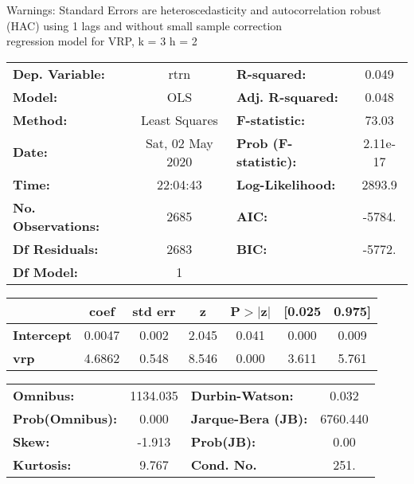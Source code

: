Warnings: \newline
 [1] Standard Errors are heteroscedasticity and autocorrelation robust (HAC) using 1 lags and without small sample correction\\ 

regression model for VRP, k = 3 h = 2\begin{center}
\begin{tabular}{lclc}
\toprule
\textbf{Dep. Variable:}    &       rtrn       & \textbf{  R-squared:         } &     0.049   \\
\textbf{Model:}            &       OLS        & \textbf{  Adj. R-squared:    } &     0.048   \\
\textbf{Method:}           &  Least Squares   & \textbf{  F-statistic:       } &     73.03   \\
\textbf{Date:}             & Sat, 02 May 2020 & \textbf{  Prob (F-statistic):} &  2.11e-17   \\
\textbf{Time:}             &     22:04:43     & \textbf{  Log-Likelihood:    } &    2893.9   \\
\textbf{No. Observations:} &        2685      & \textbf{  AIC:               } &    -5784.   \\
\textbf{Df Residuals:}     &        2683      & \textbf{  BIC:               } &    -5772.   \\
\textbf{Df Model:}         &           1      & \textbf{                     } &             \\
\bottomrule
\end{tabular}
\begin{tabular}{lcccccc}
                   & \textbf{coef} & \textbf{std err} & \textbf{z} & \textbf{P$> |$z$|$} & \textbf{[0.025} & \textbf{0.975]}  \\
\midrule
\textbf{Intercept} &       0.0047  &        0.002     &     2.045  &         0.041        &        0.000    &        0.009     \\
\textbf{vrp}       &       4.6862  &        0.548     &     8.546  &         0.000        &        3.611    &        5.761     \\
\bottomrule
\end{tabular}
\begin{tabular}{lclc}
\textbf{Omnibus:}       & 1134.035 & \textbf{  Durbin-Watson:     } &    0.032  \\
\textbf{Prob(Omnibus):} &   0.000  & \textbf{  Jarque-Bera (JB):  } & 6760.440  \\
\textbf{Skew:}          &  -1.913  & \textbf{  Prob(JB):          } &     0.00  \\
\textbf{Kurtosis:}      &   9.767  & \textbf{  Cond. No.          } &     251.  \\
\bottomrule
\end{tabular}
\end{center}

